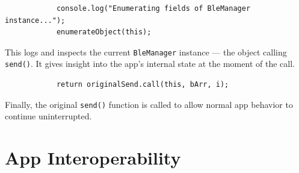 		\begin{lstlisting}
			console.log("Enumerating fields of BleManager instance...");
			enumerateObject(this);
		\end{lstlisting}
		This logs and inspects the current \texttt{BleManager} instance — the object calling \texttt{send()}. It gives insight into the app’s internal state at the moment of the call.
		
		\begin{lstlisting}
			return originalSend.call(this, bArr, i);
\end{lstlisting}
Finally, the original \texttt{send()} function is called to allow normal app behavior to continue uninterrupted.


\section{App Interoperability}


